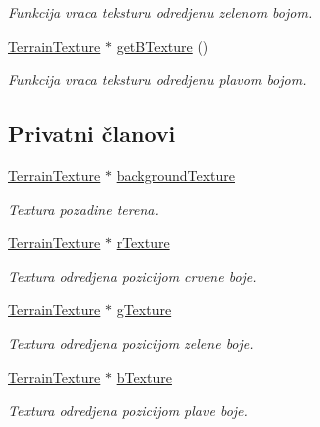 \begin{DoxyCompactItemize}
\begin{DoxyCompactList}\small\item\em Funkcija vraca teksturu odredjenu zelenom bojom. \end{DoxyCompactList}\item 
\hyperlink{classtexture_1_1TerrainTexture}{Terrain\+Texture} $\ast$ \hyperlink{classtexture_1_1TerrainTexturePack_a458ca66ed71f945af5e3878de073bb33}{get\+B\+Texture} ()
\begin{DoxyCompactList}\small\item\em Funkcija vraca teksturu odredjenu plavom bojom. \end{DoxyCompactList}\end{DoxyCompactItemize}
\subsection*{Privatni članovi}
\begin{DoxyCompactItemize}
\item 
\hyperlink{classtexture_1_1TerrainTexture}{Terrain\+Texture} $\ast$ \hyperlink{classtexture_1_1TerrainTexturePack_a5fcc575543662461b66195cfa21875b1}{background\+Texture}
\begin{DoxyCompactList}\small\item\em Textura pozadine terena. \end{DoxyCompactList}\item 
\hyperlink{classtexture_1_1TerrainTexture}{Terrain\+Texture} $\ast$ \hyperlink{classtexture_1_1TerrainTexturePack_a08b5f1b7665151358b6b162627fc37d4}{r\+Texture}
\begin{DoxyCompactList}\small\item\em Textura odredjena pozicijom crvene boje. \end{DoxyCompactList}\item 
\hyperlink{classtexture_1_1TerrainTexture}{Terrain\+Texture} $\ast$ \hyperlink{classtexture_1_1TerrainTexturePack_aee84140926644080ce963c6ffe5288da}{g\+Texture}
\begin{DoxyCompactList}\small\item\em Textura odredjena pozicijom zelene boje. \end{DoxyCompactList}\item 
\hyperlink{classtexture_1_1TerrainTexture}{Terrain\+Texture} $\ast$ \hyperlink{classtexture_1_1TerrainTexturePack_a004a654fdda8c9f552f40986e2dd072f}{b\+Texture}
\begin{DoxyCompactList}\small\item\em Textura odredjena pozicijom plave boje. \end{DoxyCompactList}\end{DoxyCompactItemize}


